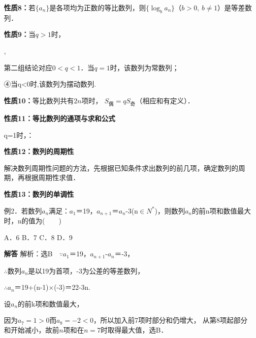 \par\medskip\noindent\textbf{性质8：}若$\{a_n\}$是各项均为正数的等比数列，则$\{\log_ba_n\}$（$b>0,\ b\ne1$）是等差数列．\par
\par\medskip\noindent\textbf{性质9：}当$q>1$时，\par
{},                 \par
第二组结论对应$0<q<1$．当$q=1$时，该数列为常数列；\par
④当q<0时,该数列为摆动数列.\par
\par\medskip\noindent\textbf{性质10：}等比数列共有$2n$项时，
$S_{\text{偶}}=qS_{\text{奇}}$（相应和有定义）．\par
\par\medskip\noindent\textbf{性质11：等比数列的通项与求和公式}\par
{}q=1时，：\par
\par\medskip\noindent\textbf{性质12：数列的周期性}\par
\qquad{}解决数列周期性问题的方法，先根据已知条件求出数列的前几项，确定数列的周期，再根据周期性求值．\par
\par\medskip\noindent\textbf{性质13：数列的单调性}\par

\qquad{}例2．若数列{\ensuremath{a_{n}}}满足：\ensuremath{a_{1}}＝19，\ensuremath{a_{n+1}}＝\ensuremath{a_{n}}-3(n\ensuremath{\in}\ensuremath{N^{*}})，则数列{\ensuremath{a_{n}}}的前n项和数值最大时，n的值为(　　)\par
\qquad{}A．6      B．7      C．8  \qquad{}D．9\par
\QuestionSpace{2.5cm}
\ifshowanswers
\par\begingroup\color{solutioncolor}\noindent\textbf{解答}\quad
\qquad{}解析：选B　\ensuremath{\because}\ensuremath{a_{1}}＝19，\ensuremath{a_{n+1}}-\ensuremath{a_{n}}＝-3，\par
\qquad{}\ensuremath{\therefore}数列{\ensuremath{a_{n}}}是以19为首项，-3为公差的等差数列，\par
\qquad{}\ensuremath{\therefore}\ensuremath{a_{n}}＝19+(n-1)\ensuremath{\times}(-3)＝22-3n.\par
\qquad{}设{\ensuremath{a_{n}}}的前k项和数值最大，\par
因为$a_7=1>0$而$a_8=-2<0$，所以加入前7项时部分和仍增大，
从第8项起部分和开始减小，故前$n$项和在$n=7$时取得最大值，选B．\par
\par\endgroup\fi

